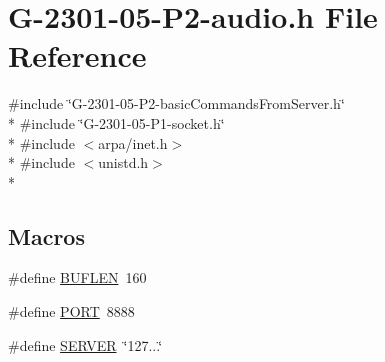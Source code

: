 \hypertarget{_g-2301-05-_p2-audio_8h}{\section{G-\/2301-\/05-\/\-P2-\/audio.h File Reference}
\label{_g-2301-05-_p2-audio_8h}
}
{\ttfamily \#include \char`\"{}G-\/2301-\/05-\/\-P2-\/basic\-Commands\-From\-Server.\-h\char`\"{}}\\*
{\ttfamily \#include \char`\"{}G-\/2301-\/05-\/\-P1-\/socket.\-h\char`\"{}}\\*
{\ttfamily \#include $<$arpa/inet.\-h$>$}\\*
{\ttfamily \#include $<$unistd.\-h$>$}\\*
\subsection*{Macros}
\begin{DoxyCompactItemize}
\item 
\#define \hyperlink{_g-2301-05-_p2-audio_8h_ad974fe981249f5e84fbf1683b012c9f8}{B\-U\-F\-L\-E\-N}~160
\item 
\#define \hyperlink{_g-2301-05-_p2-audio_8h_a614217d263be1fb1a5f76e2ff7be19a2}{P\-O\-R\-T}~8888
\item 
\#define \hyperlink{_g-2301-05-_p2-audio_8h_a24cd3c37a165a8c4626d9e78df4574ff}{S\-E\-R\-V\-E\-R}~\char`\"{}127...\char`\"{}
\end{DoxyCompactItemize}
